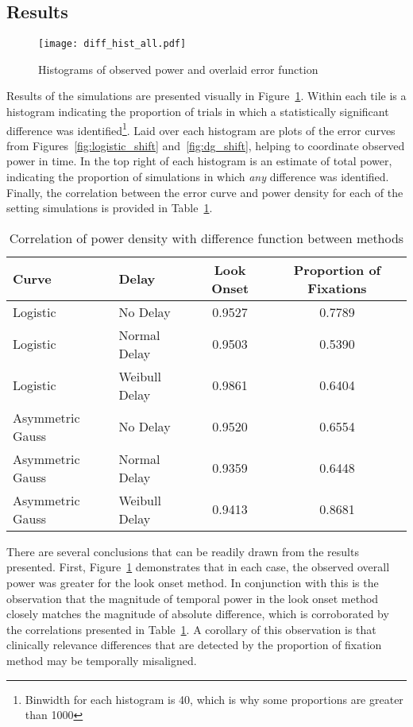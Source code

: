 \subsection{Results}

\begin{figure}[H]
\centering
\texttt{[image: diff\_hist\_all.pdf]}
\caption{Histograms of observed power and overlaid error function}
\label{fig:diff_hist_all}
\end{figure}


Results of the simulations are presented visually in Figure~\ref{fig:diff_hist_all}. Within each tile is a histogram indicating the proportion of trials in which a statistically significant difference was identified\footnote{Binwidth for each histogram is 40, which is why some proportions are greater than 1000}. Laid over each histogram are plots of the error curves from Figures~\ref{fig:logistic_shift} and~\ref{fig:dg_shift}, helping to coordinate observed power in time. In the top right of each histogram is an estimate of total power, indicating the proportion of simulations in which \textit{any} difference was identified. Finally, the correlation between the error curve and power density for each of the setting simulations is provided in Table~\ref{tab:correlation_power}.


\begin{table}[H]
\centering
\begin{tabular}{llcc}
  \hline
Curve & Delay & Look Onset & Proportion of Fixations \\ 
  \hline
Logistic & No Delay & 0.9527 & 0.7789 \\ 
  Logistic & Normal Delay & 0.9503 & 0.5390 \\ 
  Logistic & Weibull Delay & 0.9861 & 0.6404 \\ 
  Asymmetric Gauss & No Delay & 0.9520 & 0.6554 \\ 
  Asymmetric Gauss & Normal Delay & 0.9359 & 0.6448 \\ 
  Asymmetric Gauss & Weibull Delay & 0.9413 & 0.8681 \\ 
   \hline
\end{tabular}
\caption{Correlation of power density with difference function between methods}
\label{tab:correlation_power}
\end{table}

There are several conclusions that can be readily drawn from the results presented. First, Figure~\ref{fig:diff_hist_all} demonstrates that in each case, the observed overall power was greater for the look onset method. In conjunction with this is the observation that the magnitude of temporal power in the look onset method closely matches the magnitude of absolute difference, which is corroborated by the correlations presented in Table~\ref{tab:correlation_power}. A corollary of this observation is that clinically relevance differences that are detected by the proportion of fixation method may be temporally misaligned. 




